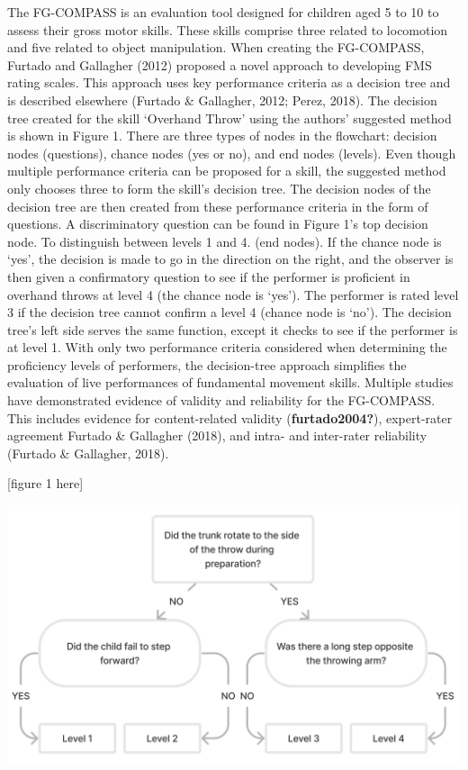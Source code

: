 \documentclass[
  man,
  colorlinks=true,linkcolor=blue,citecolor=blue,urlcolor=blue]{apa7}
\begin{document}
The FG-COMPASS is an evaluation tool designed for children aged 5 to 10
to assess their gross motor skills. These skills comprise three related
to locomotion and five related to object manipulation. When creating the
FG-COMPASS, Furtado and Gallagher (2012) proposed a novel approach to
developing FMS rating scales. This approach uses key performance
criteria as a decision tree and is described elsewhere (Furtado \&
Gallagher, 2012; Perez, 2018). The decision tree created for the skill
`Overhand Throw' using the authors' suggested method is shown in Figure
1. There are three types of nodes in the flowchart: decision nodes
(questions), chance nodes (yes or no), and end nodes (levels). Even
though multiple performance criteria can be proposed for a skill, the
suggested method only chooses three to form the skill's decision tree.
The decision nodes of the decision tree are then created from these
performance criteria in the form of questions. A discriminatory question
can be found in Figure 1's top decision node. To distinguish between
levels 1 and 4. (end nodes). If the chance node is `yes', the decision
is made to go in the direction on the right, and the observer is then
given a confirmatory question to see if the performer is proficient in
overhand throws at level 4 (the chance node is `yes'). The performer is
rated level 3 if the decision tree cannot confirm a level 4 (chance node
is `no'). The decision tree's left side serves the same function, except
it checks to see if the performer is at level 1. With only two
performance criteria considered when determining the proficiency levels
of performers, the decision-tree approach simplifies the evaluation of
live performances of fundamental movement skills. Multiple studies have
demonstrated evidence of validity and reliability for the FG-COMPASS.
This includes evidence for content-related validity
(\textbf{furtado2004?}), expert-rater agreement Furtado \& Gallagher
(2018), and intra- and inter-rater reliability (Furtado \& Gallagher,
2018).

{[}figure 1 here{]}

\includegraphics{images/fgcompass-dt-man-ot.png}
\end{document}
